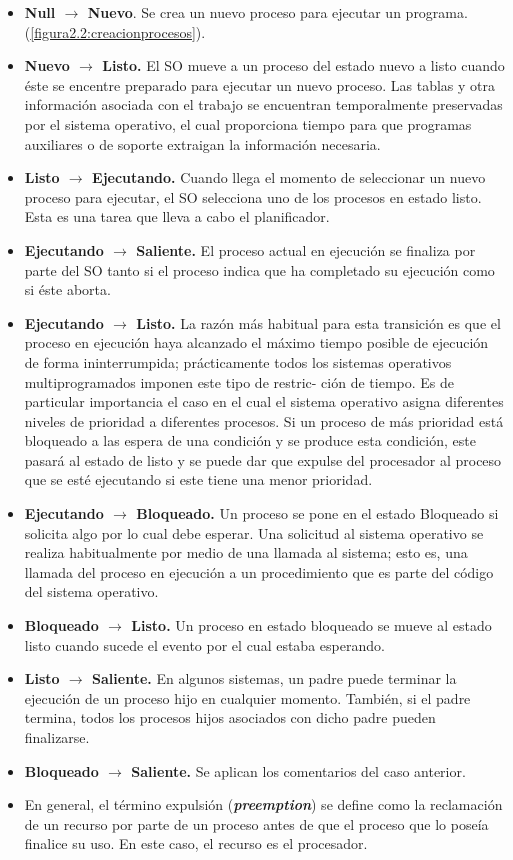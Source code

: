 \documentclass{article}
\begin{document}
				\begin{itemize}
				\item \textbf{Null $\rightarrow$ Nuevo}. Se crea un nuevo proceso para ejecutar un programa. (\ref{figura2.2:creacionprocesos}).
				\item \textbf{Nuevo $\rightarrow$ Listo.} El SO mueve a un proceso del estado nuevo a listo cuando éste se encentre preparado para ejecutar un nuevo proceso. Las
tablas y otra información asociada con el trabajo se encuentran temporalmente preservadas por el sistema operativo, el cual proporciona tiempo para que programas auxiliares o de soporte extraigan la información necesaria.
				\item \textbf{Listo $\rightarrow$ Ejecutando.} Cuando llega el momento de seleccionar un nuevo proceso para ejecutar, el SO selecciona uno de los procesos en estado listo. Esta es una tarea que lleva a cabo el planificador.
				\item \textbf{Ejecutando $\rightarrow$ Saliente.} El proceso actual en ejecución se finaliza por parte del SO tanto si el proceso indica que ha completado su ejecución como si éste aborta.
				\item \textbf{Ejecutando $\rightarrow$ Listo.} La razón más habitual para esta transición es que el proceso en ejecución haya alcanzado el máximo tiempo posible de ejecución de forma ininterrumpida;
prácticamente todos los sistemas operativos multiprogramados imponen este tipo de restric-
ción de tiempo. Es de particular importancia el caso en el cual el sistema operativo asigna diferentes niveles de prioridad a diferentes procesos. Si un proceso de más prioridad está bloqueado a las espera de una condición y se produce esta condición, este pasará al estado de listo y se puede dar que expulse del procesador al proceso que se esté ejecutando si este tiene una menor prioridad.
				\item \textbf{Ejecutando $\rightarrow$ Bloqueado.} Un proceso se pone en el estado Bloqueado si solicita algo por lo cual debe esperar. Una solicitud al sistema operativo se realiza habitualmente por medio de
una llamada al sistema; esto es, una llamada del proceso en ejecución a un procedimiento que es parte del código del sistema operativo.
				\item \textbf{Bloqueado $\rightarrow$ Listo.} Un proceso en estado bloqueado se mueve al estado listo cuando sucede el evento por el cual estaba esperando.
				\item \textbf{Listo $\rightarrow$ Saliente.} En algunos sistemas, un padre puede terminar la ejecución de un proceso hijo en cualquier momento. También, si el padre termina, todos los procesos hijos asociados con dicho padre pueden finalizarse.
				\item \textbf{Bloqueado $\rightarrow$ Saliente.} Se aplican los comentarios del caso anterior.
				
				\item En general, el término expulsión (\textbf{\textit{preemption}}) se define como la reclamación de un recurso por parte de un proceso antes de que el proceso que lo poseía finalice su uso. En este caso, el recurso es el procesador.
				\end{itemize}
				
\end{document}
